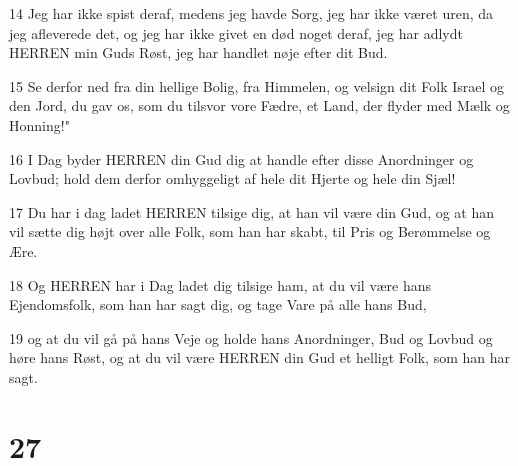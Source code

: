 \par 14 Jeg har ikke spist deraf, medens jeg havde Sorg, jeg har ikke været uren, da jeg afleverede det, og jeg har ikke givet en død noget deraf, jeg har adlydt HERREN min Guds Røst, jeg har handlet nøje efter dit Bud.
\par 15 Se derfor ned fra din hellige Bolig, fra Himmelen, og velsign dit Folk Israel og den Jord, du gav os, som du tilsvor vore Fædre, et Land, der flyder med Mælk og Honning!"
\par 16 I Dag byder HERREN din Gud dig at handle efter disse Anordninger og Lovbud; hold dem derfor omhyggeligt af hele dit Hjerte og hele din Sjæl!
\par 17 Du har i dag ladet HERREN tilsige dig, at han vil være din Gud, og at han vil sætte dig højt over alle Folk, som han har skabt, til Pris og Berømmelse og Ære.
\par 18 Og HERREN har i Dag ladet dig tilsige ham, at du vil være hans Ejendomsfolk, som han har sagt dig, og tage Vare på alle hans Bud,
\par 19 og at du vil gå på hans Veje og holde hans Anordninger, Bud og Lovbud og høre hans Røst, og at du vil være HERREN din Gud et helligt Folk, som han har sagt.

\chapter{27}

